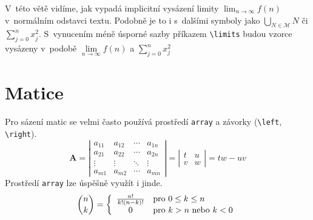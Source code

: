\documentclass[11pt, a4paper, twocolumn]{article}
\begin{document}
V~této větě vidíme, jak vypadá implicitní vysázení limity $\lim_{n\rightarrow\infty}f(n)$ v~normálním odstavci textu. Podobně je to i s~dalšími symboly jako $\bigcup_{N\in \mathcal{M}}N$ či $\sum_{j=0}^n x_j^2$. 
S~vynucením méně úsporné sazby příkazem \verb|\limits| budou vzorce vysázeny v~podobě $\lim\limits _{n\rightarrow\infty}f(n)$ a $\sum\limits _{j=0} ^{n} x_j^2$ 


\section{Matice}

Pro sázení matic se velmi často používá prostředí \texttt{array} a závorky (\verb|\left|, \verb|\right|). 
$$ \mathbf{A} = \left| \begin{array}{cccc}
a_{11} & a_{12} & \cdots & a_{1n} \\
a_{21} & a_{22} & \cdots & a_{2n} \\
\vdots & \vdots & \ddots & \vdots \\
a_{m1} & a_{m2} & \cdots & a_{mn} \end{array} \right|=
\left|\begin{array}{cc}
t & u \\
v & w\end{array}\right| = tw-uv$$ 
Prostředí \texttt{array} lze úspěšně využít i jinde.
$$ \binom{n}{k} = \left\{
\begin{array}{c l}
\frac{n!}{k!(n-k)!} & \text{pro } 0\leq k\leq n \\
0 & \text{pro } k > n \text{ nebo } k < 0
\end{array} \right. $$
\end{document}
